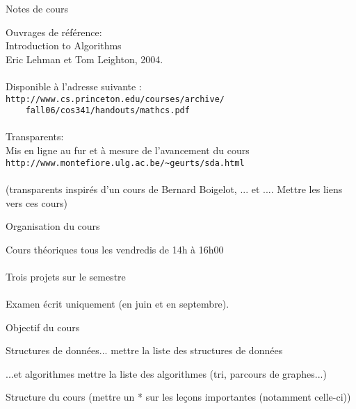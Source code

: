 
\begin{frame}{Notes de cours}

Ouvrages de référence:\\

Introduction to Algorithms\\
Eric Lehman et Tom Leighton, 2004.\\
~\\
Disponible à l'adresse suivante : \\
{\tt http://www.cs.princeton.edu/courses/archive/}\\
{\tt ~~~~fall06/cos341/handouts/mathcs.pdf}\\
~\\
Transparents:\\
Mis en ligne au fur et à mesure de l'avancement du cours\\

{\tt http://www.montefiore.ulg.ac.be/\~{}geurts/sda.html}\\
~\\
(transparents inspirés d'un cours de Bernard Boigelot, ... et .... Mettre les liens vers ces cours)

\end{frame}

\begin{frame}{Organisation du cours}

Cours théoriques tous les vendredis de 14h à 16h00\\
~\\
Trois projets sur le semestre\\
~\\
Examen écrit uniquement (en juin et en septembre).\\

\end{frame}

\begin{frame}{Objectif du cours}



\end{frame}

\begin{frame}{Structures de données...}
mettre la liste des structures de données
\end{frame}

\begin{frame}{...et algorithmes}
mettre la liste des algorithmes (tri, parcours de graphes...)
\end{frame}

\begin{frame}{Structure du cours}
(mettre un * sur les leçons importantes (notamment celle-ci))
\end{frame}
